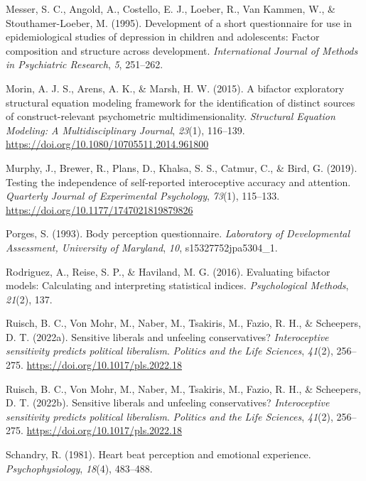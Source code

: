 \documentclass[
  man,
  floatsintext,
  longtable,
  nolmodern,
  notxfonts,
  notimes,
  colorlinks=true,linkcolor=blue,citecolor=blue,urlcolor=blue]{apa7}
\newlength{\cslhangindent}
\newenvironment{CSLReferences}[2] %
 {\begin{list}{}{%
  \setlength{\itemindent}{0pt}
  \setlength{\leftmargin}{0pt}
  \setlength{\parsep}{0pt}
  \ifodd #1
   \setlength{\leftmargin}{\cslhangindent}
   \setlength{\itemindent}{-1\cslhangindent}
  \fi
  \setlength{\itemsep}{#2\baselineskip}}}
 {\end{list}}
\begin{document}
\begin{CSLReferences}{1}{0}
Messer, S. C., Angold, A., Costello, E. J., Loeber, R., Van Kammen, W.,
\& Stouthamer-Loeber, M. (1995). Development of a short questionnaire
for use in epidemiological studies of depression in children and
adolescents: Factor composition and structure across development.
\emph{International Journal of Methods in Psychiatric Research},
\emph{5}, 251--262.

Morin, A. J. S., Arens, A. K., \& Marsh, H. W. (2015). A bifactor
exploratory structural equation modeling framework for the
identification of distinct sources of construct-relevant psychometric
multidimensionality. \emph{Structural Equation Modeling: A
Multidisciplinary Journal}, \emph{23}(1), 116--139.
\url{https://doi.org/10.1080/10705511.2014.961800}

Murphy, J., Brewer, R., Plans, D., Khalsa, S. S., Catmur, C., \& Bird,
G. (2019). Testing the independence of self-reported interoceptive
accuracy and attention. \emph{Quarterly Journal of Experimental
Psychology}, \emph{73}(1), 115--133.
\url{https://doi.org/10.1177/1747021819879826}

Porges, S. (1993). Body perception questionnaire. \emph{Laboratory of
Developmental Assessment, University of Maryland}, \emph{10},
s15327752jpa5304\_1.

Rodriguez, A., Reise, S. P., \& Haviland, M. G. (2016). Evaluating
bifactor models: Calculating and interpreting statistical indices.
\emph{Psychological Methods}, \emph{21}(2), 137.

Ruisch, B. C., Von Mohr, M., Naber, M., Tsakiris, M., Fazio, R. H., \&
Scheepers, D. T. (2022a). Sensitive liberals and unfeeling
conservatives? {\emph{Interoceptive sensitivity predicts political
liberalism}}. \emph{Politics and the Life Sciences}, \emph{41}(2),
256--275. \url{https://doi.org/10.1017/pls.2022.18}

Ruisch, B. C., Von Mohr, M., Naber, M., Tsakiris, M., Fazio, R. H., \&
Scheepers, D. T. (2022b). Sensitive liberals and unfeeling
conservatives? {\emph{Interoceptive sensitivity predicts political
liberalism}}. \emph{Politics and the Life Sciences}, \emph{41}(2),
256--275. \url{https://doi.org/10.1017/pls.2022.18}

Schandry, R. (1981). Heart beat perception and emotional experience.
\emph{Psychophysiology}, \emph{18}(4), 483--488.


\end{CSLReferences}
\end{document}
